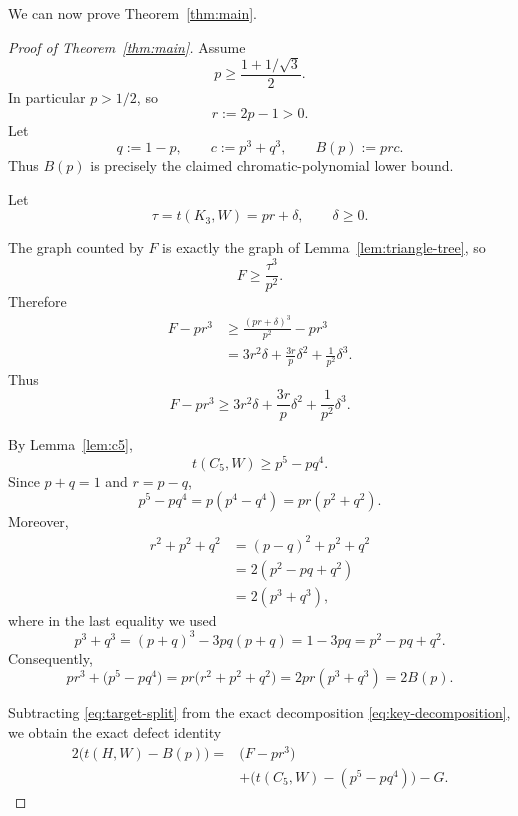 \documentclass[11pt]{article}
\begin{document}
We can now prove Theorem~\ref{thm:main}.

\begin{proof}[Proof of Theorem~\ref{thm:main}]
Assume
\[
p\ge\frac{1+1/\sqrt3}{2}.
\]
In particular \(p>1/2\), so
\[
r:=2p-1>0.
\]
Let
\[
q:=1-p,
\qquad
c:=p^3+q^3,
\qquad
B(p):=prc.
\]
Thus \(B(p)\) is precisely the claimed chromatic-polynomial lower bound.

Let
\[
\tau=t(K_3,W)=pr+\delta,
\qquad
\delta\ge0.
\]

The graph counted by \(F\) is exactly the graph of
Lemma~\ref{lem:triangle-tree}, so
\[
F\ge\frac{\tau^3}{p^2}.
\]
Therefore
\[
\begin{aligned}
F-pr^3
&\ge
\frac{(pr+\delta)^3}{p^2}-pr^3\\
&=
3r^2\delta
+
\frac{3r}{p}\delta^2
+
\frac1{p^2}\delta^3.
\end{aligned}
\]
Thus
\begin{equation}\label{eq:F-surplus}
F-pr^3
\ge
3r^2\delta
+
\frac{3r}{p}\delta^2
+
\frac1{p^2}\delta^3.
\end{equation}

By Lemma~\ref{lem:c5},
\begin{equation}\label{eq:C5-surplus}
t(C_5,W)
\ge
p^5-pq^4.
\end{equation}
Since \(p+q=1\) and \(r=p-q\),
\[
p^5-pq^4
=
p(p^4-q^4)
=
pr(p^2+q^2).
\]
Moreover,
\[
\begin{aligned}
r^2+p^2+q^2
&=
(p-q)^2+p^2+q^2\\
&=
2(p^2-pq+q^2)\\
&=
2(p^3+q^3),
\end{aligned}
\]
where in the last equality we used
\[
p^3+q^3=(p+q)^3-3pq(p+q)=1-3pq
=p^2-pq+q^2.
\]
Consequently,
\begin{equation}\label{eq:target-split}
pr^3+\bigl(p^5-pq^4\bigr)
=
pr\bigl(r^2+p^2+q^2\bigr)
=
2pr(p^3+q^3)
=
2B(p).
\end{equation}

Subtracting \eqref{eq:target-split} from the exact decomposition
\eqref{eq:key-decomposition}, we obtain the exact defect identity
\begin{equation}\label{eq:defect-exact}
\boxed{
\begin{aligned}
2\bigl(t(H,W)-B(p)\bigr)
={}&
\bigl(F-pr^3\bigr)\\
&+
\bigl(t(C_5,W)-(p^5-pq^4)\bigr)
-G.
\end{aligned}
}
\end{equation}


\end{proof}
\end{document}
